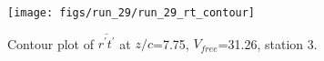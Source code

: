 \begin{figure}[H]
\centering
\texttt{[image: figs/run\_29/run\_29\_rt\_contour]}
\caption{Contour plot of $\overline{r^\prime t^\prime}$ at $z/c$=7.75, $V_{free}$=31.26, station 3.}
\label{fig:run_29_rt_contour}
\end{figure}


